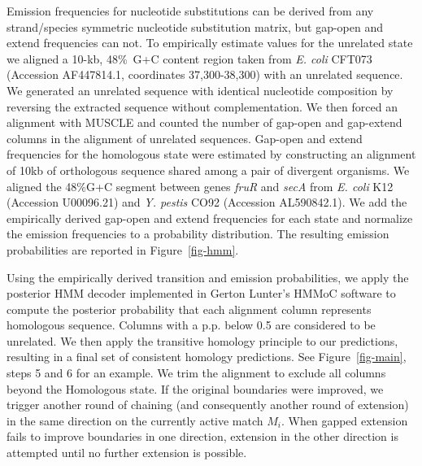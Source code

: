 \documentclass{llncs}
\begin{document}
\begin{comment}
Taking  A G pair for example, we have
pi_A * exp{Q(A,G)t} + pi_G*exp{Q(G,A)t}  but since the substitution
process is reversible, Q(A,G)=Q(G,A) and so we're left with
(pi_A+pi_G)*exp{Q(A,G)t}.  So the thing to do here is divide by the
original pi_A+pi_G and multiply by the new pi_A+pi_G.  For the HOXD the
original pi_A+pi_G is 0.525/2 + 0.475/2 = 0.2625+0.2375 = 0.5.  And
indeed, by definition, the new pi_A+pi_G is also 0.5!  So we don't have
to do anything with those values.

I suppose a similar problem arises in the A->T mutations (also T->A, G-
>C, C->G).  for those we're looking at pi_A * exp{Q(A,T)t} + pi_T*exp{Q
(T,A)t}.  which reduces to (pi_A+pi_T)*exp{Q(A,T)t}.  Where pi_A+pi_T =
0.525 in the original HOXD data, and so we will want to compute it for
the new data and adjust emissions accordingly (by dividing old and
multiplying new, pre-gap-normalization.
\end{comment}

Emission frequencies for nucleotide substitutions can be derived from
any strand/species symmetric nucleotide substitution matrix, but gap-open
and extend frequencies can not.  To empirically estimate values
for the unrelated state we aligned a 10-kb, 48\%~G+C content region
taken from \emph{E. coli} CFT073 (Accession AF447814.1, coordinates
37,300-38,300) with an unrelated sequence.  We generated an unrelated
sequence with identical nucleotide composition by reversing the
extracted sequence without complementation.  We then forced an
alignment with MUSCLE and counted the number of gap-open and gap-extend
columns in the alignment of unrelated sequences.  Gap-open and
extend frequencies for the homologous state were estimated by
constructing an alignment of 10kb of orthologous sequence shared among
a pair of divergent organisms.  We aligned the 48\%G+C segment between
genes \textit{fruR} and \textit{secA} from \textit{E. coli} K12
(Accession U00096.21) and \emph{Y. pestis} CO92 (Accession
AL590842.1). We add the empirically derived gap-open and extend
frequencies for each state and normalize the emission frequencies to a
probability distribution.  The resulting emission probabilities are
reported in Figure~\ref{fig-hmm}.

Using the empirically derived transition and emission probabilities,
we apply the posterior HMM decoder implemented in Gerton Lunter's
HMMoC software\cite{hmmoc} to compute the posterior probability that
each alignment column represents homologous sequence.  Columns with a
p.p. below 0.5 are considered to be unrelated.  We then apply the
transitive homology principle to our predictions, resulting in a final
set of consistent homology predictions.  See Figure~\ref{fig-main},
steps 5 and 6 for an example. We trim the alignment to exclude all
columns beyond the Homologous state. If the original boundaries were
improved, we trigger another round of chaining (and consequently
another round of extension) in the same direction on the currently
active match $M_i$.  When gapped extension fails to improve boundaries
in one direction, extension in the other direction is attempted until
no further extension is possible.
\end{document}
